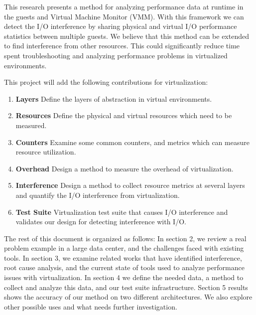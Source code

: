 \indent This research presents a method for analyzing performance data at runtime in the guests and Virtual Machine Monitor (VMM).   With this framework we can detect the I/O interference by sharing physical and virtual I/O performance statistics between multiple guests.  We believe that this method can be extended to find interference from other resources.  This could significantly reduce time spent troubleshooting and analyzing performance problems in virtualized environments.

\indent This project will add the following contributions for virtualization:
\begin{enumerate}
\item \textbf{Layers} Define the layers of abstraction in virtual environments.
\item \textbf{Resources} Define the physical and virtual resources which need to be measured.
\item \textbf{Counters} Examine some common counters, and metrics which can measure resource utilization.
\item \textbf{Overhead} Design a method to measure the overhead of virtualization.
\item \textbf{Interference} Design a method to collect resource metrics at several layers and quantify the I/O interference from virtualization.
\item \textbf{Test Suite} Virtualization test suite that causes I/O interference and validates our design for detecting interference with I/O.
\end{enumerate}

\indent The rest of this document is organized as follows:  In section 2, we review a real problem example in a large data center, and the challenges faced with existing tools.  In section 3, we examine related works that have identified interference, root cause analysis, and the current state of tools used to analyze performance issues with virtualization.   In section 4 we define the needed data, a method to collect and analyze this data, and our test suite infrastructure.  Section 5 results shows the accuracy of our method on two different architectures.  We also explore other possible uses and what needs further investigation.
